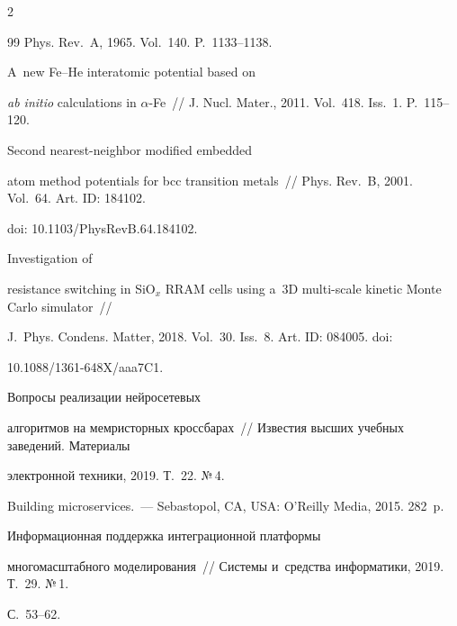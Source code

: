 \begin{multicols}{2}
{{\begin{thebibliography}{99}
Phys. Rev.~A, 1965. Vol.~140. P.~1133--1138.     




  A~new Fe--He interatomic potential based on 


\textit{ab initio} calculations in $\alpha$-Fe~// J. Nucl. Mater., 2011. Vol.~418. Iss.~1. P.~115--120. 




  Second nearest-neighbor modified embedded 


atom method potentials for bcc transition metals~// Phys. Rev.~B, 2001. Vol.~64. Art. ID: 184102. 


doi: 10.1103/PhysRevB.64.184102.




  Investigation of 


resistance switching in SiO$_x$ RRAM cells using a~3D multi-scale kinetic Monte Carlo simulator~// 


J.~Phys. Condens. Matter, 2018. Vol.~30. Iss.~8. Art. ID: 084005. doi: 


10.1088/1361-648X/aaa7C1.




  Вопросы реализации нейросетевых 


алгоритмов на мемристорных кроссбарах~// Известия высших учебных заведений. Материалы 


электронной техники, 2019. Т.~22. №\,4. %




  Building microservices.~--- Sebastopol, CA, USA: O'Reilly Media, 2015. 282~p.




  Информационная поддержка интеграционной платформы 


многомасштабного моделирования~// Системы и~средства информатики, 2019. Т.~29. №\,1. 


С.~53--62.


\end{thebibliography}





 }


 }





\end{multicols}





